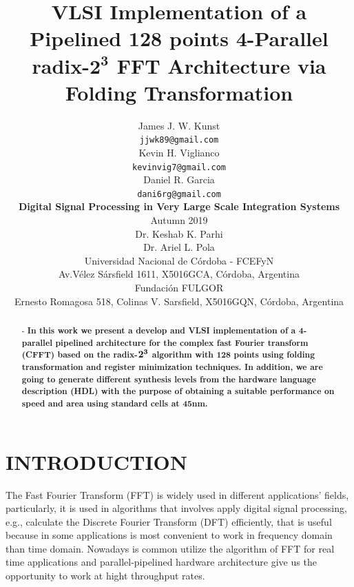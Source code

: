 \documentclass[journal,comsoc]{IEEEtran}
\begin{document}
\title{
\huge \bf VLSI Implementation of a Pipelined 128 points 4-Parallel radix-$\mathbf{2^3}$ FFT Architecture via Folding Transformation
}
\author{
James J. W. Kunst   \\{\tt\small jjwk89@gmail.com}		\\
Kevin H. Viglianco	\\{\tt\small kevinvig7@gmail.com}	\\ 
Daniel R. Garcia	\\{\tt\small dani6rg@gmail.com}		\\
[0.5cm]
{\large \bf Digital Signal Processing in Very Large Scale Integration Systems}\\
[0.5cm]
Autumn 2019\\
[0.5cm]
Dr. Keshab K. Parhi	\\
Dr. Ariel L. Pola	\\
[0.5cm]
Universidad Nacional de Córdoba - FCEFyN\\
Av.Vélez Sársfield 1611, X5016GCA, C\'ordoba, Argentina\\
[0.5cm]
Fundación FULGOR\\
Ernesto Romagosa 518, Colinas V. Sarsfield, X5016GQN, Córdoba, Argentina         
}
\maketitle


\begin{abstract} - \bf In this work we present a develop and VLSI implementation of a 4-parallel pipelined architecture for the complex fast Fourier transform (CFFT) based on the radix-$\bf 2^3$ algorithm with 128 points using folding transformation and register minimization techniques. In addition, we are going to generate different synthesis levels from the hardware language description (HDL) with the purpose of obtaining a suitable performance on speed and area using standard cells at 45nm. %
\end{abstract}
\section{INTRODUCTION}
The Fast Fourier Transform (FFT) is widely used in different applications' fields, particularly, it is used in algorithms that involves apply digital signal processing, e.g., calculate the Discrete Fourier Transform (DFT) efficiently, that is useful because in some applications is most convenient to work in frequency domain than time domain. Nowadays is common utilize the algorithm of FFT for real time applications and parallel-pipelined hardware architecture give us the opportunity to work at hight throughput rates.
\end{document}
